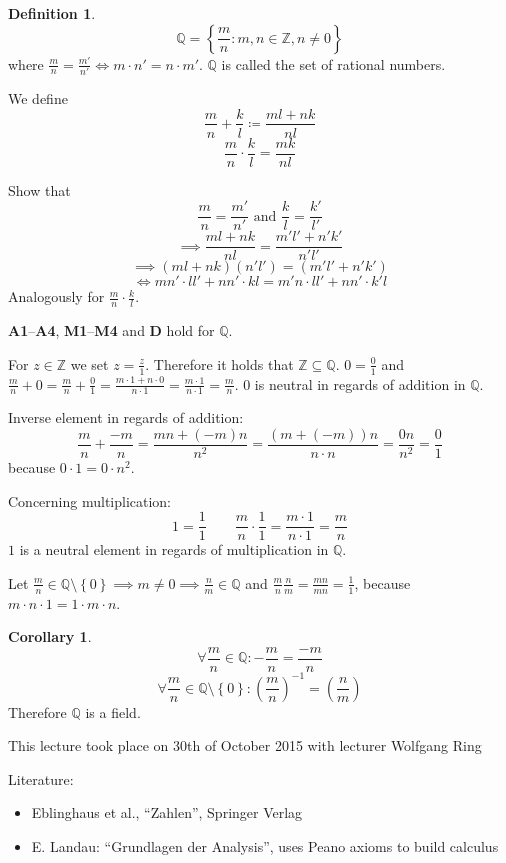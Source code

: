 \documentclass[a4paper,landscape,twocolumn]{article}
\theoremstyle{definition}
\newtheorem{defi}{Definition}
\newtheorem{cor}{Corollary}
\newcommand\set[1]{\left\{#1\right\}}
\newcommand\meta[3]{\begin{mdframed}[skipbelow=4pt,skipabove=4pt,innermargin=1pt,innerleftmargin=1pt,innerrightmargin=1pt]\begin{center}\small{\textdownarrow{} This #1 took place on #2 with lecturer #3}\end{center}\end{mdframed}}
\begin{document}
\begin{defi}
  \[ \mathbb{Q} = \set{\frac mn: m,n \in \mathbb{Z}, n \neq 0} \]
  where $\frac mn = \frac{m'}{n'} \iff m \cdot n' = n \cdot m'$.
  $\mathbb{Q}$ is called the set of rational numbers.

  We define
  \[ \frac mn + \frac kl \coloneqq \frac{ml + nk}{nl} \]
  \[ \frac mn \cdot \frac kl = \frac{mk}{nl} \]

  Show that
  \[ \frac mn = \frac{m'}{n'} \text{ and } \frac kl = \frac{k'}{l'} \]
  \[ \implies \frac{ml + nk}{nl} = \frac{m'l' + n'k'}{n'l'} \]
  \[ \implies (ml + nk)(n' l') = (m' l' + n' k') \]
  \[ \iff mn' \cdot ll' + nn' \cdot kl = m'n \cdot ll' + nn' \cdot k' l \]
  Analogously for $\frac mn \cdot \frac kl$.

  \textbf{A1}--\textbf{A4}, \textbf{M1}--\textbf{M4} and \textbf{D} hold for $\mathbb{Q}$.

  For $z \in \mathbb{Z}$ we set $z = \frac z1$.
  Therefore it holds that $\mathbb{Z} \subseteq \mathbb{Q}$.
  $0 = \frac 01$ and $\frac mn + 0 = \frac mn + \frac 01 = \frac{m\cdot 1 + n\cdot 0}{n\cdot 1} = \frac{m \cdot 1}{n\cdot 1} = \frac mn$.
  $0$ is neutral in regards of addition in $\mathbb{Q}$.

  Inverse element in regards of addition:
  \[ \frac mn + \frac{-m}n = \frac{mn + (-m)n}{n^2} = \frac{(m + (-m)) n}{n \cdot n} = \frac{0n}{n^2} = \frac 01 \]
  because $0 \cdot 1 = 0 \cdot n^2$.

  Concerning multiplication:
  \[ 1 = \frac 11 \qquad \frac mn \cdot \frac 11 = \frac{m\cdot 1}{n\cdot 1} = \frac mn \]
  $1$ is a neutral element in regards of multiplication in $\mathbb{Q}$.

  Let $\frac mn \in \mathbb{Q} \setminus \set{0} \implies m \neq 0 \implies \frac nm \in \mathbb{Q}$ and $\frac mn \frac nm = \frac{mn}{mn} = \frac 11$,
  because $m \cdot n \cdot 1 = 1\cdot m \cdot n$.
\end{defi}

\begin{cor}
  \[ \forall \frac mn \in \mathbb{Q}: -\frac mn = \frac{-m}{n} \]
  \[ \forall \frac mn \in \mathbb{Q} \setminus \set{0}: \left(\frac mn\right)^{-1} = \left(\frac nm\right) \]
  Therefore $\mathbb{Q}$ is a field.
\end{cor}

\meta{lecture}{30th of October 2015}{Wolfgang Ring}

Literature:
\begin{itemize}
  \item Eblinghaus et al., \enquote{Zahlen}, Springer Verlag
  \item E. Landau: \enquote{Grundlagen der Analysis}, uses Peano axioms to build calculus
\end{itemize}
\end{document}
